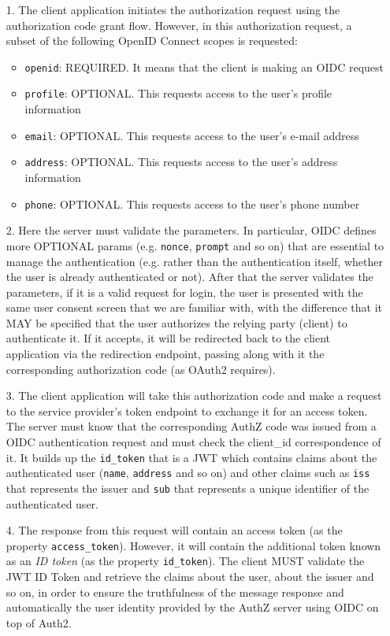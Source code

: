 \begin{itemize}
    \item[1.] The client application initiates the authorization request using the authorization code grant flow. However, in this authorization request, a subset of the following OpenID Connect scopes is requested:
    \item[] \begin{itemize}
        \item \texttt{openid}: REQUIRED. It means that the client is making an OIDC request
        \item \texttt{profile}: OPTIONAL. This requests access to the user's
    profile information
        \item \texttt{email}: OPTIONAL. This requests access to the user's e-mail address
        \item \texttt{address}: OPTIONAL. This requests access to the user's  address information
        \item \texttt{phone}: OPTIONAL. This requests access to the user's phone number
    \end{itemize}
    
    \item[2.] Here the server must validate the parameters. In particular, OIDC defines more OPTIONAL params (e.g. \texttt{nonce}, \texttt{prompt} and so on) that are essential to manage the authentication (e.g. rather than the authentication itself, whether the user is already authenticated or not). After that the server validates the parameters, if it is a valid request for login, the user is presented with the same user consent screen that we are familiar with, with the difference that it MAY be specified that the user authorizes the relying party (client) to authenticate it. If it accepts, it will be redirected back to the client application via the redirection endpoint, passing along with it the corresponding authorization code (as OAuth2 requires).
    \item[3.] The client application will take this authorization code and make a request to the service provider's token endpoint to exchange it for an access token. The server must know that the corresponding AuthZ code was issued from a OIDC authentication request and must check the client\_id correspondence of it. It builds up the \texttt{id\_token} that is a JWT which contains claims about the authenticated user (\texttt{name}, \texttt{address} and so on) and other claims such as \texttt{iss} that represents the issuer and \texttt{sub} that represents a unique identifier of the authenticated user.
    \item[4.] The response from this request will contain an access token (as the property \texttt{access\_token}). However, it will contain the additional token known as an \textit{ID token} (as the property \texttt{id\_token}). The client MUST validate the JWT ID Token and retrieve the claims about the user, about the issuer and so on, in order to ensure the truthfulness of the message response and automatically the user identity provided by the AuthZ server using OIDC on top of Auth2.
\end{itemize}


